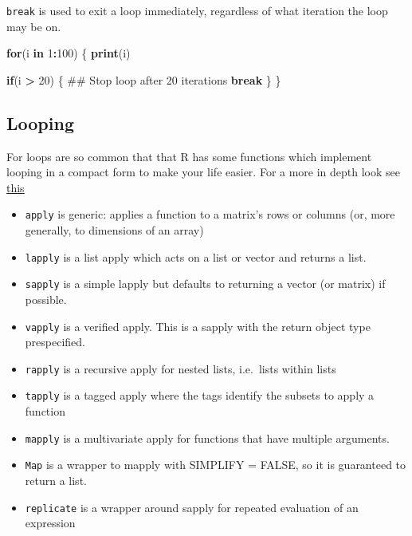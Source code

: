 \documentclass[]{book}
\newenvironment{Shaded}{\begin{snugshade}}{\end{snugshade}}
\newcommand{\KeywordTok}[1]{\textcolor[rgb]{0.13,0.29,0.53}{\textbf{#1}}}
\newcommand{\DecValTok}[1]{\textcolor[rgb]{0.00,0.00,0.81}{#1}}
\newcommand{\StringTok}[1]{\textcolor[rgb]{0.31,0.60,0.02}{#1}}
\newcommand{\ControlFlowTok}[1]{\textcolor[rgb]{0.13,0.29,0.53}{\textbf{#1}}}
\newcommand{\OperatorTok}[1]{\textcolor[rgb]{0.81,0.36,0.00}{\textbf{#1}}}
\newcommand{\NormalTok}[1]{#1}
\providecommand{\tightlist}{%
  \setlength{\itemsep}{0pt}\setlength{\parskip}{0pt}}
\theoremstyle{definition}
\theoremstyle{definition}
\theoremstyle{definition}
\theoremstyle{remark}
\begin{document}
\texttt{break} is used to exit a loop immediately, regardless of what
iteration the loop may be on.

\begin{Shaded}
\begin{Highlighting}[]
\ControlFlowTok{for}\NormalTok{(i }\ControlFlowTok{in} \DecValTok{1}\OperatorTok{:}\DecValTok{100}\NormalTok{) \{}
      \KeywordTok{print}\NormalTok{(i)}

      \ControlFlowTok{if}\NormalTok{(i }\OperatorTok{>}\StringTok{ }\DecValTok{20}\NormalTok{) \{}
\NormalTok{              ## Stop loop after 20 iterations}
              \ControlFlowTok{break}  
\NormalTok{      \}     }
\NormalTok{\}}
\end{Highlighting}
\end{Shaded}

\subsection{Looping}\label{looping}

For loops are so common that that R has some functions which implement
looping in a compact form to make your life easier. For a more in depth
look see
\href{https://bookdown.org/rdpeng/rprogdatascience/loop-functions.html}{this}

\begin{itemize}
\tightlist
\item
  \texttt{apply} is generic: applies a function to a matrix's rows or
  columns (or, more generally, to dimensions of an array)
\item
  \texttt{lapply} is a list apply which acts on a list or vector and
  returns a list.
\item
  \texttt{sapply} is a simple lapply but defaults to returning a vector
  (or matrix) if possible.
\item
  \texttt{vapply} is a verified apply. This is a sapply with the return
  object type prespecified.
\item
  \texttt{rapply} is a recursive apply for nested lists, i.e.~lists
  within lists
\item
  \texttt{tapply} is a tagged apply where the tags identify the subsets
  to apply a function
\item
  \texttt{mapply} is a multivariate apply for functions that have
  multiple arguments.
\item
  \texttt{Map} is a wrapper to mapply with SIMPLIFY = FALSE, so it is
  guaranteed to return a list.
\item
  \texttt{replicate} is a wrapper around sapply for repeated evaluation
  of an expression
\end{itemize}
\end{document}

